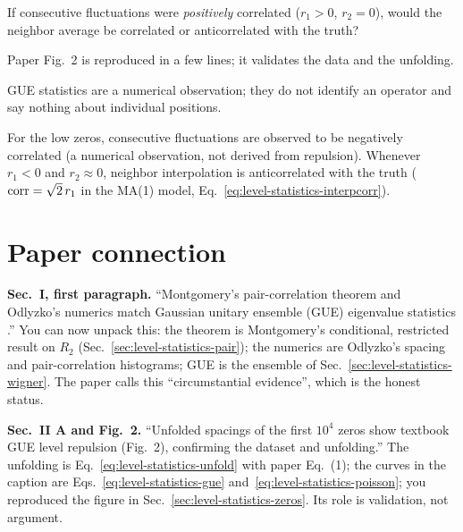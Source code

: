 \begin{checkpoint}
If consecutive fluctuations were \emph{positively} correlated ($r_1>0$, $r_2=0$), would the neighbor average be correlated or anticorrelated with the truth?
\end{checkpoint}

\begin{keyideas}
\item Paper Fig.~2 is reproduced in a few lines; it validates the data and the unfolding.
\item GUE statistics are a numerical observation; they do not identify an operator and say nothing about individual positions.
\item For the low zeros, consecutive fluctuations are observed to be negatively correlated (a numerical observation, not derived from repulsion). Whenever $r_1<0$ and $r_2\approx0$, neighbor interpolation is anticorrelated with the truth ($\mathrm{corr}=\sqrt2\,r_1$ in the MA(1) model, Eq.~\eqref{eq:level-statistics-interpcorr}).
\end{keyideas}

\section{Paper connection}\label{sec:level-statistics-paper}

\textbf{Sec.~I, first paragraph.} ``Montgomery's pair-correlation theorem and Odlyzko's numerics match Gaussian unitary ensemble (GUE) eigenvalue statistics \cite{montgomery,odlyzko87}.'' You can now unpack this: the theorem is Montgomery's conditional, restricted result on $R_2$ (Sec.~\ref{sec:level-statistics-pair}); the numerics are Odlyzko's spacing and pair-correlation histograms; GUE is the ensemble of Sec.~\ref{sec:level-statistics-wigner}. The paper calls this ``circumstantial evidence'', which is the honest status.

\textbf{Sec.~II A and Fig.~2.} ``Unfolded spacings of the first $10^4$ zeros show textbook GUE level repulsion (Fig.~2), confirming the dataset and unfolding.'' The unfolding is Eq.~\eqref{eq:level-statistics-unfold} with paper Eq.~(1); the curves in the caption are Eqs.~\eqref{eq:level-statistics-gue} and~\eqref{eq:level-statistics-poisson}; you reproduced the figure in Sec.~\ref{sec:level-statistics-zeros}. Its role is validation, not argument.

